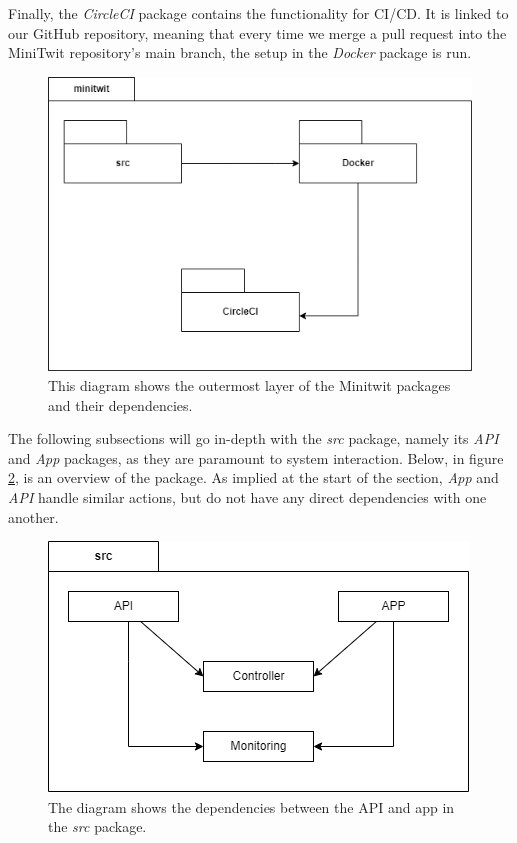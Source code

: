 Finally, the \textit{CircleCI} package contains the functionality for CI/CD. It is linked to our GitHub repository, meaning that every time we merge a pull request into the MiniTwit repository's main branch, the setup in the \textit{Docker} package is run.

\begin{figure}[H]
    \centering
    \includegraphics[scale=0.60]{images/packages.png}
    \caption{This diagram shows the outermost layer of the Minitwit packages and their dependencies.}
    \label{fig:packages}
\end{figure}

The following subsections will go in-depth with the \textit{src} package, namely its \textit{API} and \textit{App} packages, as they are paramount to system interaction. Below, in figure \ref{fig:src}, is an overview of the package. As implied at the start of the section, \textit{App} and \textit{API} handle similar actions, but do not have any direct dependencies with one another. 


\begin{figure}[H]
    \centering
    \includegraphics[scale=0.75]{images/src.png}
    \caption{The diagram shows the dependencies between the API and app in the \textit{src} package.}
    \label{fig:src}
\end{figure}

